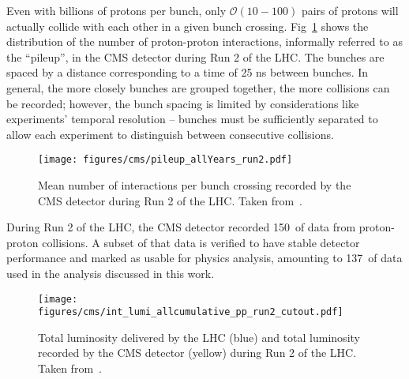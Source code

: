 Even with billions of protons per bunch, only $\mathcal O(10-100)$ pairs of protons will actually collide with each other in a given bunch crossing. %
Fig~\ref{fig:cms_pileup} shows the distribution of the number of proton-proton interactions, informally referred to as the ``pileup'', in the CMS detector during Run 2 of the LHC. 
The bunches are spaced by a distance corresponding to a time of 25 ns between bunches.
In general, the more closely bunches are grouped together, the more collisions can be recorded; however, the bunch spacing is limited by considerations like experiments' temporal resolution -- bunches must be sufficiently separated to allow each experiment to distinguish between consecutive collisions.

\begin{figure} [htbp!]
    \centering
    \texttt{[image: figures/cms/pileup\_allYears\_run2.pdf]}
    \caption{Mean number of interactions per bunch crossing recorded by the CMS detector during Run 2 of the LHC. Taken from~\cite{public_lumi}.}
    \label{fig:cms_pileup}
\end{figure}

During Run 2 of the LHC, the CMS detector recorded 150~\fbinv of data from proton-proton collisions.
A subset of that data is verified to have stable detector performance and marked as usable for physics analysis, amounting to 137~\fbinv of data used in the analysis discussed in this work.

\begin{figure} [htbp!]
    \centering
    \texttt{[image: figures/cms/int\_lumi\_allcumulative\_pp\_run2\_cutout.pdf]}
    \caption{Total luminosity delivered by the LHC (blue) and total luminosity recorded by the CMS detector (yellow) during Run 2 of the LHC. Taken from~\cite{public_lumi}.}
    \label{fig:cms_lumi}
\end{figure}
